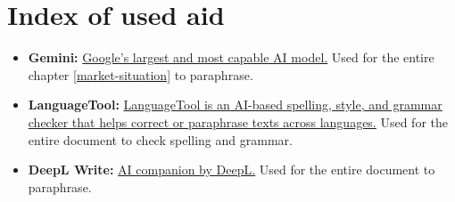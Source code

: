 \chapter{Index of used aid}\label{label-aid-index}

\begin{itemize}
  \item \textbf{Gemini:} \href{https://gemini.google.com/}{Google's largest and most capable AI model.} Used for the entire chapter \ref{market-situation} to paraphrase.
  \item \textbf{LanguageTool:} \href{https://languagetool.org/}{LanguageTool is an AI-based spelling, style, and grammar checker that helps correct or paraphrase texts across languages.} Used for the entire document to check spelling and grammar.
  \item \textbf{DeepL Write:} \href{https://www.deepl.com/write}{AI companion by DeepL.} Used for the entire document to paraphrase.
\end{itemize}